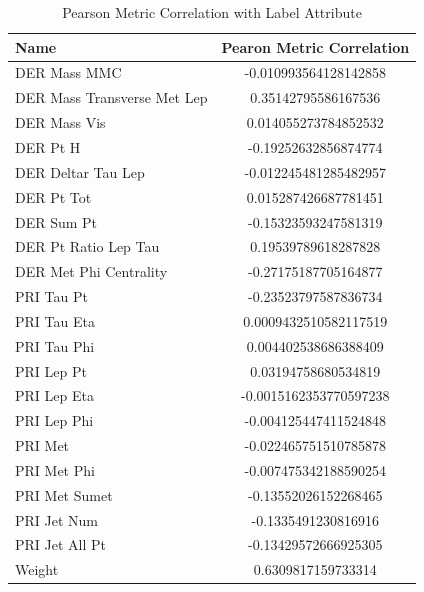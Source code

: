 \documentclass[conference]{IEEEtran}
\begin{document}
\begin{table}[h!]
  \begin{center}
    \caption{Pearson Metric Correlation with Label Attribute}
    \label{tab:table1}
    \begin{tabular}{l|S}
      \textbf{Name} & \textbf{Pearon Metric Correlation}\\
      \hline
      DER Mass MMC & -0.010993564128142858\\
      DER Mass Transverse Met Lep & 0.35142795586167536\\
      DER Mass Vis & 0.014055273784852532\\ 
      DER Pt H & -0.19252632856874774\\ 
      DER Deltar Tau Lep & -0.012245481285482957\\ 
      DER Pt Tot & 0.015287426687781451\\ 
      DER Sum Pt & -0.15323593247581319\\ 
      DER Pt Ratio Lep Tau & 0.19539789618287828\\ 
      DER Met Phi Centrality & -0.27175187705164877\\ 
      PRI Tau Pt & -0.23523797587836734\\
      PRI Tau Eta & 0.0009432510582117519\\
      PRI Tau Phi & 0.004402538686388409\\
      PRI Lep Pt & 0.03194758680534819\\
      PRI Lep Eta & -0.0015162353770597238\\
      PRI Lep Phi & -0.004125447411524848\\
      PRI Met & -0.022465751510785878\\
      PRI Met Phi & -0.007475342188590254\\
      PRI Met Sumet & -0.13552026152268465\\
      PRI Jet Num & -0.1335491230816916\\
      PRI Jet All Pt & -0.13429572666925305\\
      Weight & 0.6309817159733314\\
    \end{tabular}
  \end{center}
\end{table}
\end{document}
